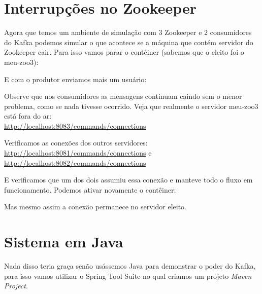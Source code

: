 \documentclass[a4paper,11pt]{article}
\begin{document}
\section{Interrupções no Zookeeper}
Agora que temos um ambiente de simulação com 3 Zookeeper e 2 consumidores do Kafka podemos simular o que acontece se a máquina que contém servidor do Zookeeper cair. Para isso vamos parar o contêiner (sabemos que o eleito foi o meu-zoo3): \\

E com o produtor enviamos mais um usuário: \\

Observe que nos consumidores as mensagens continuam caindo sem o menor problema, como se nada tivesse ocorrido. Veja que realmente o servidor meu-zoo3 está fora do ar: \\
\url{http://localhost:8083/commands/connections}

Verificamos as conexões dos outros servidores: \\
\url{http://localhost:8081/commands/connections} e \\ 
\url{http://localhost:8082/commands/connections}

E verificamos que um dos dois assumiu essa conexão e manteve todo o fluxo em funcionamento. Podemos ativar novamente o contêiner: \\

Mas mesmo assim a conexão permanece no servidor eleito.

\section{Sistema em Java}
Nada disso teria graça senão usássemos Java para demonstrar o poder do Kafka, para isso vamos utilizar o Spring Tool Suite no qual criamos um projeto \textit{Maven Project}.
\end{document}
